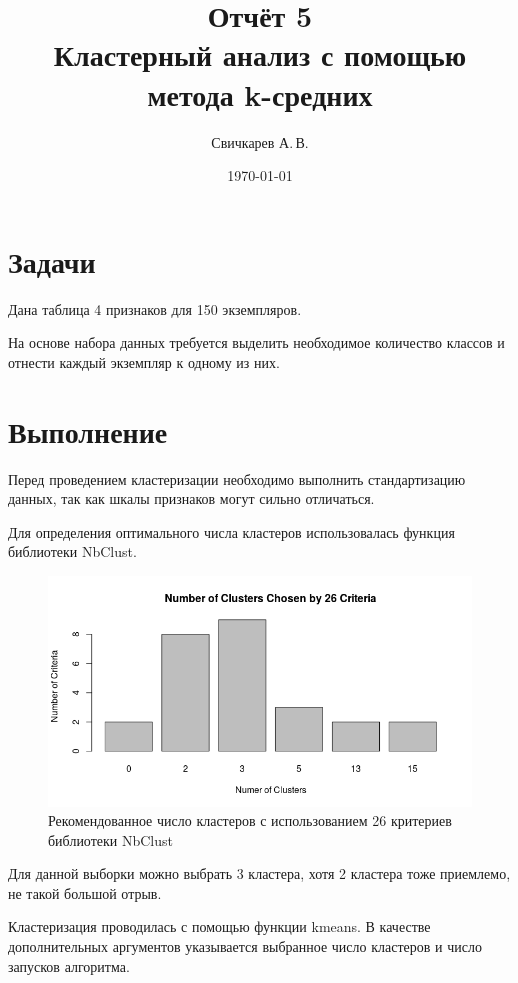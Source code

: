 \documentclass{article} %
\title{Отчёт 5\\
Кластерный анализ с помощью метода k-средних} %
\author{Свичкарев А.\,В.} %
\date{\today} %
\begin{document}

\maketitle %

\section*{Задачи}
Дана таблица 4 признаков для 150 экземпляров.

На основе набора данных требуется
выделить необходимое количество классов и
отнести каждый экземпляр к одному из них.

\clearpage
\section*{Выполнение}

Перед проведением кластеризации необходимо
выполнить стандартизацию данных,
так как шкалы признаков могут сильно отличаться.

Для определения оптимального числа кластеров
использовалась функция библиотеки NbClust.

\begin{figure}[H]
    \centering
    \includegraphics[width=\textwidth]{nclusters}
    \caption{Рекомендованное число кластеров
с использованием 26 критериев библиотеки NbClust}
\end{figure}

Для данной выборки можно выбрать 3 кластера,
хотя 2 кластера тоже приемлемо,
не такой большой отрыв.

Кластеризация проводилась с помощью
функции kmeans.
В качестве дополнительных аргументов
указывается выбранное число кластеров
и число запусков алгоритма.
\end{document}
